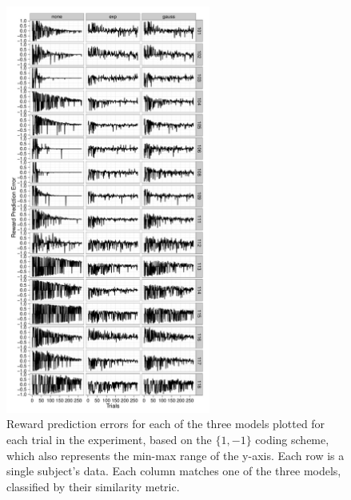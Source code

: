 \begin{figure}[tp]
    \includegraphics[width=0.6\textwidth]{f_rpe_gl}
    \centering
    \caption{Reward prediction errors for each of the three models plotted for each trial in the experiment, based on the $\{1,-1\}$ coding scheme, which also represents the min-max range of the y-axis.   Each row is a single subject's data.  Each column matches one of the three models, classified by their similarity metric.}
    \label{fig:rpegl}
\end{figure}

